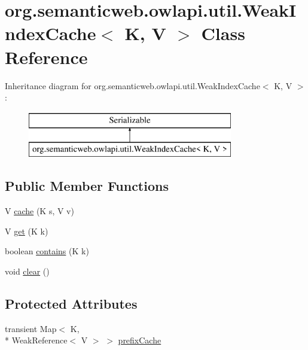 \hypertarget{classorg_1_1semanticweb_1_1owlapi_1_1util_1_1_weak_index_cache_3_01_k_00_01_v_01_4}{\section{org.\-semanticweb.\-owlapi.\-util.\-Weak\-Index\-Cache$<$ K, V $>$ Class Reference}
\label{classorg_1_1semanticweb_1_1owlapi_1_1util_1_1_weak_index_cache_3_01_k_00_01_v_01_4}
}
Inheritance diagram for org.\-semanticweb.\-owlapi.\-util.\-Weak\-Index\-Cache$<$ K, V $>$\-:\begin{figure}[H]
\begin{center}
\leavevmode
\includegraphics[height=2.000000cm]{classorg_1_1semanticweb_1_1owlapi_1_1util_1_1_weak_index_cache_3_01_k_00_01_v_01_4}
\end{center}
\end{figure}
\subsection*{Public Member Functions}
\begin{DoxyCompactItemize}
\item 
V \hyperlink{classorg_1_1semanticweb_1_1owlapi_1_1util_1_1_weak_index_cache_3_01_k_00_01_v_01_4_a3337951437fbfebf65a475980decac96}{cache} (K s, V v)
\item 
V \hyperlink{classorg_1_1semanticweb_1_1owlapi_1_1util_1_1_weak_index_cache_3_01_k_00_01_v_01_4_a0a82ead5ab600c2741e6c719e5a01e01}{get} (K k)
\item 
boolean \hyperlink{classorg_1_1semanticweb_1_1owlapi_1_1util_1_1_weak_index_cache_3_01_k_00_01_v_01_4_af9faefe641718bdf0bbbca0f58140e3a}{contains} (K k)
\item 
void \hyperlink{classorg_1_1semanticweb_1_1owlapi_1_1util_1_1_weak_index_cache_3_01_k_00_01_v_01_4_a6aea60ad746f092082df1313bea86bc0}{clear} ()
\end{DoxyCompactItemize}
\subsection*{Protected Attributes}
\begin{DoxyCompactItemize}
\item 
transient Map$<$ K, \\*
Weak\-Reference$<$ V $>$ $>$ \hyperlink{classorg_1_1semanticweb_1_1owlapi_1_1util_1_1_weak_index_cache_3_01_k_00_01_v_01_4_aa5ebc26e5b50bd5921242af8dbe27974}{prefix\-Cache}
\end{DoxyCompactItemize}
